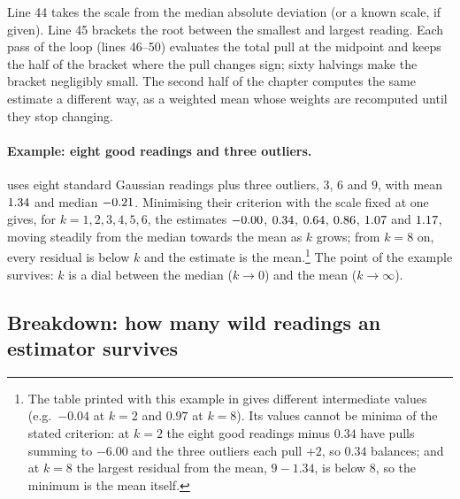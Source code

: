 
Line 44 takes the scale from the median absolute deviation (or a known
scale, if given). Line 45 brackets the root between the smallest and largest
reading. Each pass of the loop (lines 46--50) evaluates the total pull at the
midpoint and keeps the half of the bracket where the pull changes sign;
sixty halvings make the bracket negligibly small. The second half of the
chapter computes the same estimate a different way, as a weighted mean whose
weights are recomputed until they stop changing.

\paragraph{Example: eight good readings and three outliers.}
 uses eight standard Gaussian
readings plus three outliers, $3$, $6$ and $9$, with mean $1.34$
and median $-0.21$. Minimising their criterion with the scale fixed
at one gives, for $k=1,2,3,4,5,6$, the estimates $-0.00$,
$0.34$, $0.64$, $0.86$,
$1.07$ and $1.17$, moving steadily from the median
towards the mean as $k$ grows; from $k=8$ on, every residual is below $k$ and
the estimate is the mean.\footnote{The table printed with this example in
 gives different intermediate values
(e.g.\ $-0.04$ at $k=2$ and $0.97$ at $k=8$). Its values cannot be minima of
the stated criterion: at $k=2$ the eight good readings minus $0.34$ have
pulls summing to $-6.00$ and the three outliers each pull $+2$, so $0.34$
balances; and at $k=8$ the largest residual from the mean, $9-1.34$, is below
$8$, so the minimum is the mean itself.} The point of the example survives:
$k$ is a dial between the median ($k\to0$) and the mean ($k\to\infty$).

\subsection{Breakdown: how many wild readings an estimator survives}
\label{T5a:sec:breakdown}

